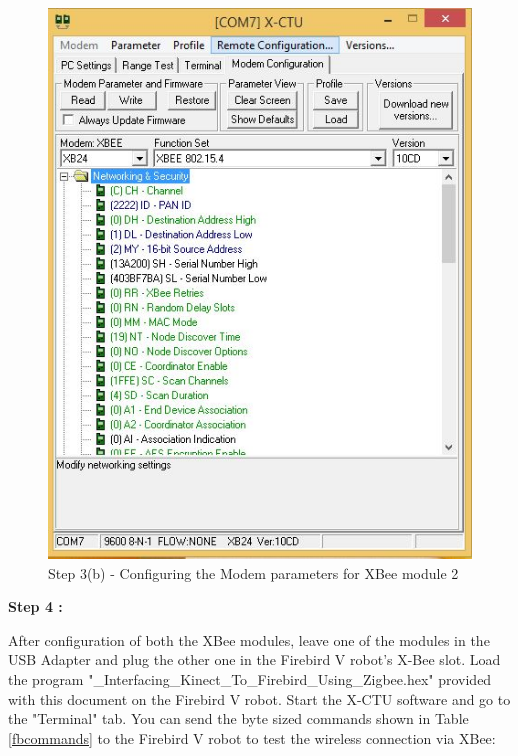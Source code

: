 \begin{flushleft}
\begin{figure}[h]
\begin{center}
\includegraphics[scale=0.5]{zigbee_13}
\end{center}
\caption{Step 3(b) - Configuring the Modem parameters for XBee module 2}
\label{xstep3.2}
\end{figure}

\newpage

\textbf{Step 4 :}

After configuration of both the XBee modules, leave one of the modules in the USB Adapter and plug the other one in the Firebird V robot's X-Bee slot. Load the program "\_Interfacing\_Kinect\_To\_Firebird\_Using\_Zigbee.hex" provided with this document on the Firebird V robot. Start the X-CTU software and go to the "Terminal" tab.  You can send the byte sized commands shown in Table \ref{fbcommands} to the Firebird V robot to test the wireless connection via XBee: 


\end{flushleft}
